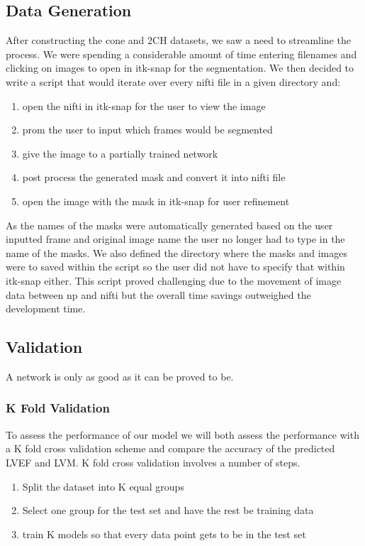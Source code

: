 \documentclass[12pt]{article}
\begin{document}
\subsection{Data Generation}
After constructing the cone and 2CH datasets, we saw a need to streamline the process. 
We were spending a considerable amount of time entering filenames and clicking on images to open in itk-snap for the segmentation.
We then decided to write a script that would iterate over every nifti file in a given directory and:
\begin{enumerate}
	\item{open the nifti in itk-snap for the user to view the image}
	\item{prom the user to input which frames would be segmented}
	\item{give the image to a partially trained network}
	\item{post process the generated mask and convert it into nifti file}
	\item{open the image with the mask in itk-snap for user refinement}
\end{enumerate}
As the names of the masks were automatically generated based on the user inputted frame and original image name the user no longer had to type in the name of the masks.
We also defined the directory where the masks and images were to saved within the script so the user did not have to specify that within itk-snap either.
This script proved challenging due to the movement of image data between np and nifti but the overall time savings outweighed the development time.


\subsection{Validation}
A network is only as good as it can be proved to be.
\subsubsection{K Fold Validation}
To assess the performance of our model we will both assess the performance with a K fold cross validation scheme and compare the accuracy of the predicted LVEF and LVM.
K fold cross validation involves a number of steps.

\begin{enumerate}
	\item{Split the dataset into K equal groups}
	\item{Select one group for the test set and have the rest be training data}
	\item{train K models so that every data point gets to be in the test set}
\end{enumerate}
\end{document}
